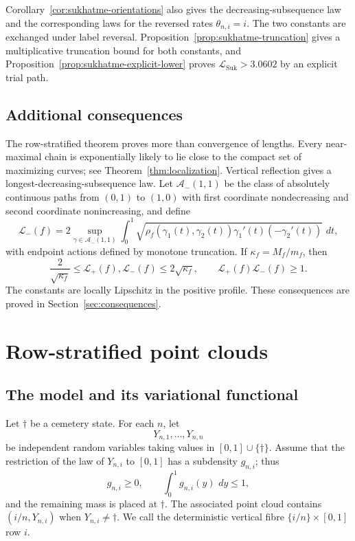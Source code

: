 \documentclass[11pt]{article}
\theoremstyle{remark}
\newcommand{\dd}{\,d}
\newcommand{\partialmark}{\dagger}
\newcommand{\calA}{\mathcal A}
\newcommand{\calL}{\mathcal L}
\begin{document}
Corollary~\ref{cor:sukhatme-orientations} also gives the decreasing-subsequence
law and the corresponding laws for the reversed rates $\theta_{n,i}=i$.
The two constants are exchanged under label reversal.
Proposition~\ref{prop:sukhatme-truncation} gives a multiplicative truncation
bound for both constants, and Proposition~\ref{prop:sukhatme-explicit-lower}
proves $\calL_{\mathrm{Suk}}>3.0602$ by an explicit trial path.

\subsection{Additional consequences}

The row-stratified theorem proves more than convergence of lengths.  Every
near-maximal chain is exponentially likely to lie close to the compact set of
maximizing curves; see Theorem~\ref{thm:localization}.  Vertical reflection
gives a longest-decreasing-subsequence law.  Let $\calA_-(1,1)$ be the class
of absolutely continuous paths from $(0,1)$ to $(1,0)$ with first coordinate
nondecreasing and second coordinate nonincreasing, and define
\begin{equation}\label{eq:Lminus-def}
 \calL_-(f)=2\sup_{\gamma\in\calA_-(1,1)}
 \int_0^1\sqrt{\rho_f(\gamma_1(t),\gamma_2(t))
                 \gamma_1'(t)(-\gamma_2'(t))}\,\dd t,
\end{equation}
with endpoint actions defined by monotone truncation.  If
$\kappa_f=M_f/m_f$, then
\begin{equation}\label{eq:universal-bounds-intro}
        \frac2{\sqrt{\kappa_f}}
        \le \calL_+(f),\calL_-(f)
        \le2\sqrt{\kappa_f},
        \qquad
        \calL_+(f)\calL_-(f)\ge1.
\end{equation}
The constants are locally Lipschitz in the positive profile.  These
consequences are proved in Section~\ref{sec:consequences}.

\section{Row-stratified point clouds}

\subsection{The model and its variational functional}

Let $\partialmark$ be a cemetery state.  For each $n$, let
\[
        Y_{n,1},\dots,Y_{n,n}
\]
be independent random variables taking values in $[0,1]\cup\{\partialmark\}$.
Assume that the restriction of the law of $Y_{n,i}$ to $[0,1]$ has a
subdensity $g_{n,i}$; thus
\[
        g_{n,i}\ge0,
        \qquad
        \int_0^1g_{n,i}(y)\,\dd y\le1,
\]
and the remaining mass is placed at $\partialmark$.  The associated point
cloud contains $(i/n,Y_{n,i})$ when $Y_{n,i}\ne\partialmark$.
We call the deterministic vertical fibre $\{i/n\}\times[0,1]$ row $i$.
\end{document}
